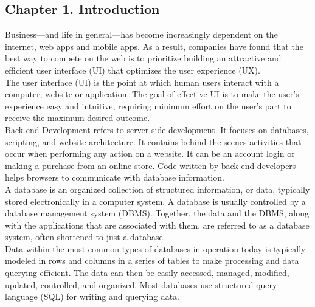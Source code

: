 \documentclass[12pt]{article}
\begin{document}
\begin{center}\section*{\Large Chapter 1. Introduction}\end{center}
\vspace{1.5cm}
\hspace{1cm}Business—and life in general—has become increasingly dependent on the internet, web apps and mobile apps. As a result, companies have found that the best way to compete on the web is to prioritize building an attractive and efficient user interface (UI) that optimizes the user experience (UX).\\
\medskip
\hspace{1cm}The user interface (UI) is the point at which human users interact with a computer, website or application. The goal of effective UI is to make the user's experience easy and intuitive, requiring minimum effort on the user's part to receive the maximum desired outcome.\\
\medskip
\hspace{1cm}Back-end Development refers to server-side development. It focuses on databases, scripting, and website architecture. It contains behind-the-scenes activities that occur when performing any action on a website. It can be an account login or making a purchase from an online store. Code written by back-end developers helps browsers to communicate with database information.\\
\medskip
\hspace{1cm}A database is an organized collection of structured information, or data, typically stored electronically in a computer system. A database is usually controlled by a database management system (DBMS). Together, the data and the DBMS, along with the applications that are associated with them, are referred to as a database system, often shortened to just a database.\\
\medskip
\hspace{1cm}Data within the most common types of databases in operation today is typically modeled in rows and columns in a series of tables to make processing and data querying efficient. The data can then be easily accessed, managed, modified, updated, controlled, and organized. Most databases use structured query language (SQL) for writing and querying data.\\
\medskip
\end{document}
